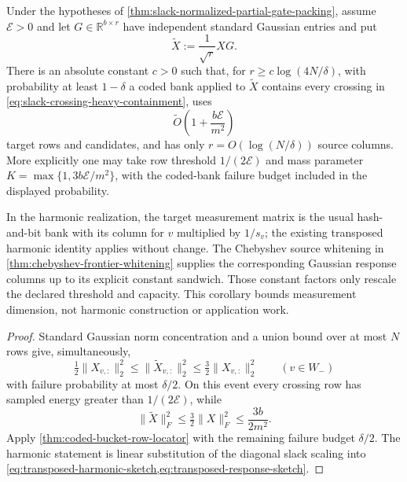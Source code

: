 \begin{corollary}
\label{cor:gaussian-compressed-slack-bank}
Under the hypotheses of
\cref{thm:slack-normalized-partial-gate-packing}, assume
$\mathcal E>0$ and let
$G\in\mathbb R^{b\times r}$ have independent standard Gaussian entries and
put
\begin{equation*}
 \widetilde X:=\frac1{\sqrt r}XG.
\end{equation*}
There is an absolute constant $c>0$ such that, for
$r\geq c\log(4N/\delta)$, with probability at least $1-\delta$ a coded bank
applied to $\widetilde X$ contains every crossing in
\cref{eq:slack-crossing-heavy-containment}, uses
\begin{equation*}
 \widetilde O\!\left(1+\frac{b\mathcal E}{m^2}\right)
\end{equation*}
target rows and candidates, and has only $r=O(\log(N/\delta))$ source
columns.  More explicitly one may take row threshold
$1/(2\mathcal E)$ and mass parameter
$K=\max\{1,3b\mathcal E/m^2\}$, with the coded-bank failure budget included
in the displayed probability.

In the harmonic realization, the target measurement matrix is the usual
hash-and-bit bank with its column for $v$ multiplied by $1/s_v$; the existing
transposed harmonic identity applies without change.  The Chebyshev source
whitening in \cref{thm:chebyshev-frontier-whitening} supplies the corresponding
Gaussian response columns up to its explicit constant sandwich.  Those
constant factors only rescale the declared threshold and capacity.  This
corollary bounds measurement dimension, not harmonic construction or
application work.
\end{corollary}

\begin{proof}
Standard Gaussian norm concentration and a union bound over at most $N$ rows
give, simultaneously,
\begin{equation*}
 \tfrac12\|X_{v,:}\|_2^2
 \leq\|\widetilde X_{v,:}\|_2^2
 \leq\tfrac32\|X_{v,:}\|_2^2
 \qquad(v\in W_-)
\end{equation*}
with failure probability at most $\delta/2$.  On this event every crossing
row has sampled energy greater than $1/(2\mathcal E)$, while
\begin{equation*}
 \|\widetilde X\|_F^2
 \leq\tfrac32\|X\|_F^2
 \leq\frac{3b}{2m^2}.
\end{equation*}
Apply \cref{thm:coded-bucket-row-locator} with the remaining failure budget
$\delta/2$.  The harmonic statement is linear substitution of the diagonal
slack scaling into
\cref{eq:transposed-harmonic-sketch,eq:transposed-response-sketch}.
\end{proof}

